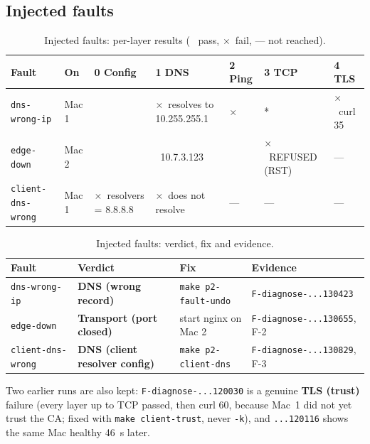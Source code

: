 \documentclass[11pt,a4paper]{article}
\newcommand{\ok}{\textcolor{lmGreen}{\checkmark}}
\newcommand{\bad}{\textcolor{lmRed}{$\times$}}
\begin{document}
\subsection{Injected faults}
\begin{table}[H]
\centering
\caption{Injected faults: per-layer results ( \ok\ pass, \bad\ fail, --- not reached).}
{\small
\begin{tabular}{@{}L{3.0cm}L{1.1cm}L{2.0cm}L{2.8cm}L{0.9cm}L{2.5cm}L{1.2cm}@{}}
\toprule
\textbf{Fault} & \textbf{On} & \textbf{0 Config} & \textbf{1 DNS} & \textbf{2 Ping} & \textbf{3 TCP} & \textbf{4 TLS} \\
\midrule
\texttt{dns-wrong-ip} & Mac 1 & \ok & \bad\ resolves to 10.255.255.1 & \bad & \ok* & \bad\ curl 35 \\
\texttt{edge-down} & Mac 2 & \ok & \ok\ 10.7.3.123 & \ok & \bad\ REFUSED (RST) & --- \\
\texttt{client-dns-wrong} & Mac 1 & \bad\ resolvers = 8.8.8.8 & \bad\ does not resolve & --- & --- & --- \\
\bottomrule
\end{tabular}}

\vspace{2pt}{\footnotesize * The campus gateway, not a real host (Incident 3).}
\end{table}

\begin{table}[!htbp]
\centering
\caption{Injected faults: verdict, fix and evidence.}
{\small
\begin{tabular}{@{}L{3.0cm}L{3.8cm}L{3.5cm}L{3.9cm}@{}}
\toprule
\textbf{Fault} & \textbf{Verdict} & \textbf{Fix} & \textbf{Evidence} \\
\midrule
\texttt{dns-wrong-ip} & \textbf{DNS (wrong record)} & \texttt{make p2-fault-undo} & \texttt{F-diagnose-...130423} \\
\texttt{edge-down} & \textbf{Transport (port closed)} & start nginx on Mac 2 & \texttt{F-diagnose-...130655}, F-2 \\
\texttt{client-dns-wrong} & \textbf{DNS (client resolver config)} & \texttt{make p2-client-dns} & \texttt{F-diagnose-...130829}, F-3 \\
\bottomrule
\end{tabular}}
\end{table}

Two earlier runs are also kept: \texttt{F-diagnose-...120030} is a genuine \textbf{TLS (trust)}
failure (every layer up to TCP passed, then curl 60, because Mac~1 did not yet trust the CA; fixed
with \texttt{make client-trust}, never \texttt{-k}), and \texttt{...120116} shows the same Mac healthy
46~s later.
\end{document}
